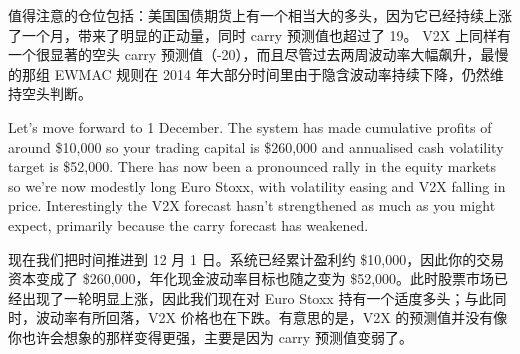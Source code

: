 \begin{chineseblock}值得注意的仓位包括：美国国债期货上有一个相当大的多头，因为它已经持续上涨了一个月，带来了明显的正动量，同时 carry 预测值也超过了 19。 V2X 上同样有一个很显著的空头 carry 预测值（-20），而且尽管过去两周波动率大幅飙升，最慢的那组 EWMAC 规则在 2014 年大部分时间里由于隐含波动率持续下降，仍然维持空头判断。\end{chineseblock}


\begin{englishblock} Let's move forward to 1 December. The system has made cumulative profits of around \$10,000 so your trading capital is \$260,000 and annualised cash volatility target is \$52,000. There has now been a pronounced rally in the equity markets so we're now modestly long Euro Stoxx, with volatility easing and V2X falling in price. Interestingly the V2X forecast hasn't strengthened as much as you might expect, primarily because the carry forecast has weakened. \end{englishblock}

\begin{chineseblock}现在我们把时间推进到 12 月 1 日。系统已经累计盈利约 \$10,000，因此你的交易资本变成了 \$260,000，年化现金波动率目标也随之变为 \$52,000。此时股票市场已经出现了一轮明显上涨，因此我们现在对 Euro Stoxx 持有一个适度多头；与此同时，波动率有所回落，V2X 价格也在下跌。有意思的是，V2X 的预测值并没有像你也许会想象的那样变得更强，主要是因为 carry 预测值变弱了。\end{chineseblock}

